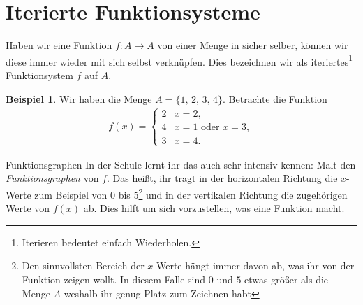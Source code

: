 \documentclass[a4paper,ngerman,12pt]{zirkelblatt1415}
\theoremstyle{definition}
\newtheorem{beispiel}[definition]{Beispiel}
\theoremstyle{remark}
\begin{document}






\section{Iterierte Funktionsysteme}

Haben wir eine Funktion $f:A\longrightarrow A$ von einer Menge in sicher selber, können wir diese immer wieder mit sich selbst verknüpfen. 
Dies bezeichnen wir als iteriertes\footnote{Iterieren bedeutet einfach Wiederholen.} Funktionsystem $f$ auf $A$.

\begin{beispiel}
\label{bsp11}
Wir haben die Menge $A=\{1,\,2,\,3,\,4 \}$. Betrachte die Funktion
\begin{align}
f(x)=\begin{cases}
2 & x=2, \\
4 & x=1 \text{ oder }x=3, \\
3 & x=4.
\end{cases} \label{beispiel}
\end{align}
\end{beispiel}



\begin{aufgabe}{Funktionsgraphen}
  In der Schule lernt ihr das auch sehr intensiv kennen: Malt den \emph{Funktionsgraphen} von $f$. 
  Das heißt, ihr tragt in der horizontalen Richtung die $x$-Werte zum Beispiel von $0$ bis $5$\footnote{Den sinnvollsten Bereich der $x$-Werte hängt immer davon ab, was ihr von der Funktion zeigen wollt. In diesem Falle sind $0$ und $5$ etwas größer als die Menge $A$ weshalb ihr genug Platz zum Zeichnen habt} und in der vertikalen Richtung die zugehörigen Werte von $f(x)$ ab. 
  Dies hilft um sich vorzustellen, was eine Funktion macht.
\end{aufgabe}
\end{document}
